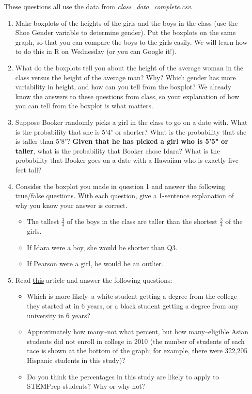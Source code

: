 \documentclass[12pt]{article}
\begin{document}
These questions all use the data from \textit{class\_data\_complete.csv}.
\begin{enumerate}
	\item Make boxplots of the heights of the girls and the boys in the class (use the Shoe Gender variable to determine gender). Put the boxplots on the same graph, so that you can compare the boys to the girls easily. We will learn how to do this in R on Wednesday (or you can Google it!).
	\item What do the boxplots tell you about the height of the average woman in the class versus the height of the average man? Why? Which gender has more variability in height, and how can you tell from the boxplot? We already know the answers to these questions from class, so your explanation of how you can tell from the boxplot is what matters.
	\item Suppose Booker randomly picks a girl in the class to go on a date with. What is the probability that she is 5'4" or shorter? What is the probability that she is taller than 5'8"? \textbf{Given that he has picked a girl who is 5'5" or taller}, what is the probability that Booker chose Idara? What is the probability that Booker goes on a date with a Hawaiian who is exactly five feet tall?
	\item Consider the boxplot you made in question 1 and answer the following true/false questions. With each question, give a 1-sentence explanation of why you know your answer is correct.
	\begin{itemize}
		\item The tallest $\frac{3}{4}$ of the boys in the class are taller than the shortest $\frac{3}{4}$ of the girls.
		\item If Idara were a boy, she would be shorter than Q3.
		\item If Pearson were a girl, he would be an outlier.
	\end{itemize}
\item Read \href{https://www.insidehighered.com/news/2017/04/26/college-completion-rates-vary-race-and-ethnicity-report-finds}{this} article and answer the following questions:
	\begin{itemize}
		\item Which is more likely--a white student getting a degree from the college they started at in 6 years, or a black student getting a degree from any university in 6 years? 
		\item Approximately how many--not what percent, but how many--eligible Asian students did not enroll in college in 2010 (the number of students of each race is shown at the bottom of the graph; for example, there were 322,205 Hispanic students in this study)? 
		\item Do you think the percentages in this study are likely to apply to STEMPrep students? Why or why not?
	\end{itemize}
\end{enumerate}
\end{document}
